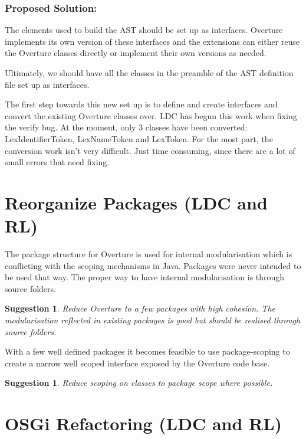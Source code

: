 \documentclass[11pt]{overturerep}
\newtheorem{sug}[subsection]{Suggestion}
\begin{document}
\subsubsection{Proposed Solution:}

The elements used to build the AST should be set up as interfaces. Overture
implements its own version of these interfaces and the extensions can
either reuse the Overture classes directly or implement their own versions
as needed.

Ultimately, we should have all the classes in the preamble of the AST
definition file set up as interfaces.

The first step towards this new set up is to define and create interfaces
and convert the existing Overture classes over. LDC has begun this work
when fixing the verify bug. At the moment, only 3 classes have been
converted: \textsf{LexIdentifierToken}, \textsf{LexNameToken} and
\textsf{LexToken}. For the most part, the conversion work isn't very
difficult. Just time consuming, since there are a lot of small errors that
need fixing.





\section{Reorganize Packages (LDC and RL)} The package structure for
Overture is used for internal modularisation which is conflicting with the
scoping mechanisms in Java.  Packages were never intended to be used that
way. The proper way to have internal modularisation is through source
folders.

\begin{sug} 
    Reduce Overture to a few packages with high cohesion. The
    modularisation reflected in existing packages is good but should be realised
    through source folders.  
\end{sug}

With a few well defined packages it becomes feasible to use package-scoping to
create a narrow well scoped interface exposed by the Overture code base.

\begin{sug} 
    Reduce scoping on classes to package scope where possible.
\end{sug}





\section{OSGi Refactoring (LDC and RL)} \label{sec:osgi} 
\end{document}
